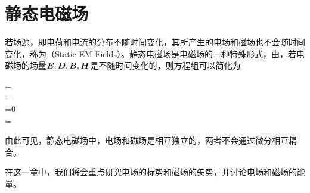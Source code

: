 \chapter{静态电磁场}
若场源，即电荷和电流的分布不随时间变化，其所产生的电场和磁场也不会随时间变化，称为（Static EM Fields）。静态电磁场是电磁场的一种特殊形式，由，若电磁场的场量$\vb*{E},\vb*{D},\vb*{B},\vb*{H}$是不随时间变化的，则方程组可以简化为
\begin{Gather}[10pt]
    \curl{}=\\
    \curl{}=\\
    \div{}=0\\
    \div{}=\rho
\end{Gather}
由此可见，静态电磁场中，电场和磁场是相互独立的，两者不会通过微分相互耦合。

在这一章中，我们将会重点研究电场的标势和磁场的矢势，并讨论电场和磁场的能量。






